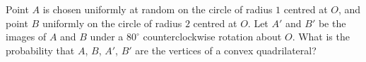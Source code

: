 Point $A$ is chosen uniformly at random on the circle of radius $1$ centred at $O$, and point $B$ uniformly on the circle of radius $2$ centred at $O$. Let $A'$ and $B'$ be the images of $A$ and $B$ under a $80^\circ$ counterclockwise rotation about $O$. What is the probability that $A$, $B$, $A'$, $B'$ are the vertices of a convex quadrilateral?
